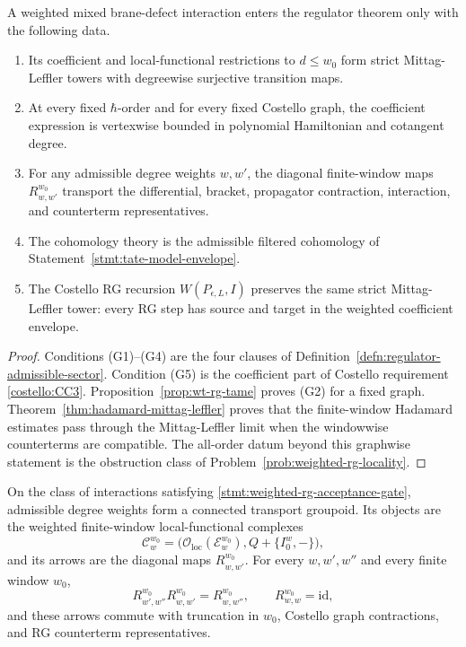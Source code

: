 \begin{stmt}\label{stmt:weighted-rg-acceptance-gate}
  A weighted mixed brane-defect interaction enters the regulator theorem
  only with the following data.
  \begin{enumerate}[label=(G\arabic*)]
    \item Its coefficient and local-functional restrictions to
      \(d\leq w_0\) form strict Mittag-Leffler towers with degreewise
      surjective transition maps.
    \item At every fixed \(\hbar\)-order and for every fixed Costello
      graph, the coefficient expression is vertexwise bounded in
      polynomial Hamiltonian and cotangent degree.
    \item For any admissible degree weights \(w,w'\), the diagonal
      finite-window maps \(R^{w_0}_{w,w'}\) transport the differential,
      bracket, propagator contraction, interaction, and counterterm
      representatives.
    \item The cohomology theory is the admissible filtered cohomology of
      Statement~\ref{stmt:tate-model-envelope}.
    \item The Costello RG recursion \(W(P_{\epsilon,L},I)\) preserves
      the same strict Mittag-Leffler tower: every RG step has source and
      target in the weighted coefficient envelope.
  \end{enumerate}
\end{stmt}

\begin{proof}
  Conditions (G1)--(G4) are the four clauses of
  Definition~\ref{defn:regulator-admissible-sector}.  Condition (G5) is
  the coefficient part of Costello requirement \ref{costello:CC3}.
  Proposition~\ref{prop:wt-rg-tame} proves (G2) for a fixed graph.
  Theorem~\ref{thm:hadamard-mittag-leffler} proves that the
  finite-window Hadamard estimates pass through the Mittag-Leffler limit
  when the windowwise counterterms are compatible.  The all-order datum
  beyond this graphwise statement is the obstruction class of
  Problem~\ref{prob:weighted-rg-locality}.
\end{proof}

\begin{thm}
\label{thm:wt-transport-groupoid}
  On the class of interactions satisfying
  \ref{stmt:weighted-rg-acceptance-gate}, admissible degree weights form
  a connected transport groupoid.  Its objects are the weighted
  finite-window local-functional complexes
  \[
    \mathcal C_w^{w_0}
      =\bigl(\mathcal O_{\mathrm{loc}}(\mathcal E_w^{w_0}),
      Q+\{I_0^w,-\}\bigr),
  \]
  and its arrows are the diagonal maps \(R^{w_0}_{w,w'}\).  For every
  \(w,w',w''\) and every finite window \(w_0\),
  \[
    R^{w_0}_{w',w''}R^{w_0}_{w,w'}=R^{w_0}_{w,w''},
    \qquad R^{w_0}_{w,w}=\mathrm{id},
  \]
  and these arrows commute with truncation in \(w_0\), Costello graph
  contractions, and RG counterterm representatives.
\end{thm}

